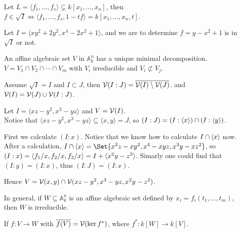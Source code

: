 \begin{theorem}
  Let $L = \langle f_1, \dots, f_s \rangle \subsetneq k[x_1, \dots, x_n]$, then
  $f \in \sqrt{I} \iff \langle f_1, \dots, f_s, 1 - tf \rangle = k[x_1, \dots, x_n, t]$.
\end{theorem}

\begin{example}
  Let $I = \langle xy^2 + 2y^2, x^4 - 2x^2 + 1 \rangle$, and we are to determine $f = y - x^2 + 1$
  is in $\sqrt{I}$ or not.
\end{example}

\begin{prop}
  An affine algebraic set $V$ in $\mathbb{A}^n_k$ has a unique minimal decomposition.
  $V = V_1 \cap V_2 \cap \dotsm \cap V_m$ with $V_i$ irreducible and $V_i \not\subset V_j$.
\end{prop}

\begin{theorem}[Decomposition]
  Assume $\sqrt{I} = I$ and $I \subset J$, then $\mathcal{V}(I : J) = \overline{\mathcal{V}(I) \setminus  \mathcal{V}(J)}$.
  and $\mathcal{V}(I) = \mathcal{V}(J) \cup \mathcal{V}(I: J)$.
\end{theorem}

\begin{example}
  Let $I = \langle xz - y^2, x^3 - yz \rangle$ and $V = \mathcal{V}(I)$. \\

  Notice that $\langle xz - y^2 , x^3 - yz \rangle \subseteq \langle x, y \rangle = J$,
  so $(I: J) = (I: \langle x \rangle) \cap (I: \langle y\rangle)$.

  First we calculate $(I: x)$. Notice that we know how to calculate $I \cap \langle x\rangle$ now.
  After a calculation, $I \cap \gen{x} = \Set{x^2z - xy^2, x^4 - xyz, x^3y - xz^2}$,
  so $(I: x) = \langle f_1/x, f_2/x, f_3/x\rangle = I + \langle x^2y - z^3\rangle$.
  Simarly one could find that $(I: y) = (I: x)$, thus $(I: J) = (I: x)$.

  Hence $V = \mathcal{V}(x, y) \cap \mathcal{V}(xz-y^2, x^3-yz, x^2y - z^2)$.
\end{example}

\begin{prop}
  In general, if $W \subseteq \mathbb{A}_k^n$ is an affine algebraic set defined by $x_i = f_i(t_1, \dots, t_m)$,
  then $W$ is irreducible.
\end{prop}

\begin{prop}
  If $f : V \to W$ with $\overline{f(V)} = \mathcal{V}(\ker f^*)$, where $f^* : k[W] \to k[V]$.
\end{prop}

